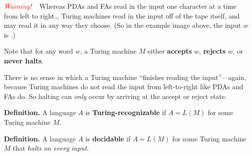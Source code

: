 \emph{\textcolor{red}{Warning!}} ~ 
Whereas PDAs and FAs read in the input
one character at a time from left to right\dots
Turing machines read in the input off of the tape itself,
and may read it in any way they choose.
(So in the example image above,
the input $w$ is .)

Note that for any word $w$, a Turing machine $M$ either
\textbf{accepts} $w$, \textbf{rejects} $w$, or \textbf{never halts}.

\begin{remark}
    There is no sense in which a Turing machine
    ``finishes reading the input''---again,
    because Turing machines do not read the input from left-to-right
    like PDAs and FAs do.
    So halting can \emph{only} occur
    by arriving at the accept or reject state.
\end{remark}

\textbf{Definition.}
A language $A$ is \textbf{Turing-recognizable} if
$A = L(M)$ for some Turing machine $M$.

\textbf{Definition.}
A language $A$ is \textbf{decidable} if
$A = L(M)$ for some Turing machine $M$ that \emph{halts on every input}.

